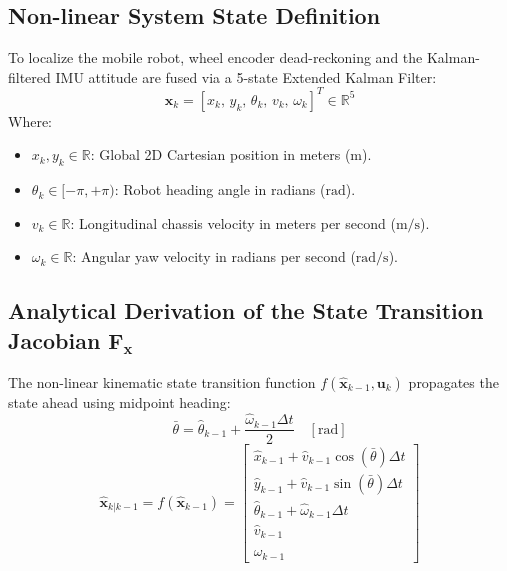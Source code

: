 \documentclass[11pt, a4paper]{article}
\begin{document}
\subsection{Non-linear System State Definition}
To localize the mobile robot, wheel encoder dead-reckoning and the Kalman-filtered IMU attitude are fused via a 5-state Extended Kalman Filter:
\begin{equation}
    \mathbf{x}_k = [x_k, \, y_k, \, \theta_k, \, v_k, \, \omega_k]^T \in \mathbb{R}^5
\end{equation}
Where:
\begin{itemize}
    \item $x_k, y_k \in \mathbb{R}$: Global 2D Cartesian position in meters ($\text{m}$).
    \item $\theta_k \in [-\pi, +\pi)$: Robot heading angle in radians ($\text{rad}$).
    \item $v_k \in \mathbb{R}$: Longitudinal chassis velocity in meters per second ($\text{m/s}$).
    \item $\omega_k \in \mathbb{R}$: Angular yaw velocity in radians per second ($\text{rad/s}$).
\end{itemize}

\subsection{Analytical Derivation of the State Transition Jacobian $\mathbf{F}_{\mathbf{x}}$}
The non-linear kinematic state transition function $f(\hat{\mathbf{x}}_{k-1}, \mathbf{u}_k)$ propagates the state ahead using midpoint heading:
\begin{equation}
    \bar{\theta} = \hat{\theta}_{k-1} + \frac{\hat{\omega}_{k-1}\Delta t}{2} \quad [\text{rad}]
\end{equation}
\begin{equation}
    \hat{\mathbf{x}}_{k|k-1} = f(\hat{\mathbf{x}}_{k-1}) = 
    \begin{bmatrix}
        \hat{x}_{k-1} + \hat{v}_{k-1} \cos(\bar{\theta}) \Delta t \\
        \hat{y}_{k-1} + \hat{v}_{k-1} \sin(\bar{\theta}) \Delta t \\
        \hat{\theta}_{k-1} + \hat{\omega}_{k-1} \Delta t \\
        \hat{v}_{k-1} \\
        \hat{\omega}_{k-1}
    \end{bmatrix}
\end{equation}
\end{document}
